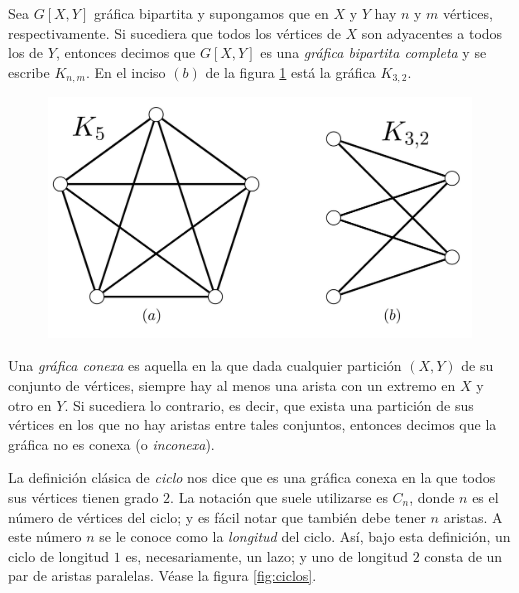 Sea $G[X,Y]$ gráfica bipartita y supongamos que en $X$ y $Y$ hay $n$ y $m$ vértices, respectivamente. Si sucediera que todos los vértices de $X$ son adyacentes a todos los de $Y$, entonces decimos que $G[X,Y]$ es una \textit{gráfica bipartita completa} y se escribe $K_{n,m}$. En el inciso $(b)$ de la figura \ref{fig:grafoscompletos} está la gráfica $K_{3,2}$.

\begin{figure}[h]
    \centering
    \includegraphics[scale=0.2]{img/imgchapter1/GrafosCompletos.jpg}
    \caption{}
    \label{fig:grafoscompletos}
\end{figure}

Una \textit{gráfica conexa}  es aquella en la que dada cualquier partición $(X,Y)$ de su conjunto de vértices, siempre hay al menos una arista con un extremo en $X$ y otro en $Y$. Si sucediera lo contrario, es decir, que exista una partición de sus vértices en los que no hay aristas entre tales conjuntos, entonces decimos que la gráfica no es conexa (o \textit{inconexa}).

La definición clásica de \textit{ciclo} nos dice que es una gráfica conexa en la que todos sus vértices tienen grado $2$. La notación que suele utilizarse es $C_{n}$, donde $n$ es el número de vértices del ciclo; y es fácil notar que también debe tener $n$ aristas. A este número $n$ se le conoce como la \textit{longitud} del ciclo. Así, bajo esta definición, un ciclo de longitud $1$ es, necesariamente, un lazo; y uno de longitud $2$ consta de un par de aristas paralelas. Véase la figura \ref{fig:ciclos}. 

